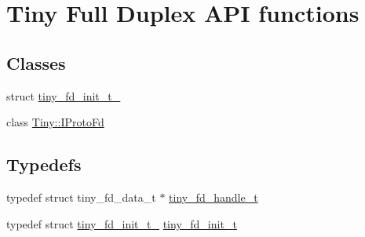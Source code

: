\hypertarget{group__FULL__DUPLEX__API}{}\section{Tiny Full Duplex A\+PI functions}
\label{group__FULL__DUPLEX__API}
\subsection*{Classes}
\begin{DoxyCompactItemize}
\item 
struct \hyperlink{structtiny__fd__init__t__}{tiny\+\_\+fd\+\_\+init\+\_\+t\+\_\+}
\item 
class \hyperlink{classTiny_1_1IProtoFd}{Tiny\+::\+I\+Proto\+Fd}
\end{DoxyCompactItemize}
\subsection*{Typedefs}
\begin{DoxyCompactItemize}
\item 
typedef struct tiny\+\_\+fd\+\_\+data\+\_\+t $\ast$ \hyperlink{group__FULL__DUPLEX__API_ga91e6b79431fe38570fb102701ef0b7e8}{tiny\+\_\+fd\+\_\+handle\+\_\+t}
\item 
typedef struct \hyperlink{structtiny__fd__init__t__}{tiny\+\_\+fd\+\_\+init\+\_\+t\+\_\+} \hyperlink{group__FULL__DUPLEX__API_gad19ac27f4ba1d2b807e0a440b0c927d2}{tiny\+\_\+fd\+\_\+init\+\_\+t}
\end{DoxyCompactItemize}
